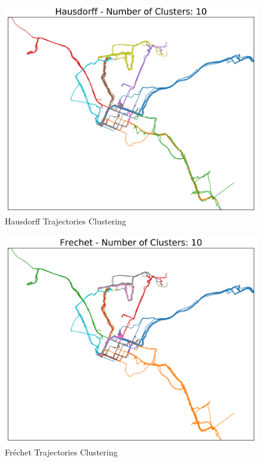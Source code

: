 \documentclass[a4paper, 12pt]{article}
\begin{document}
\begin{figure}[htbp!]
    \centering
    \includegraphics[width=1\textwidth]{hausdorff_trajectory_clustering.png}
    \caption{Hausdorff Trajectories Clustering}
    \label{fig22}
\end{figure}

\begin{figure}[htbp!]
    \centering
    \includegraphics[width=1\textwidth]{frechet_trajectory_clustering.png}
    \caption{Fréchet Trajectories Clustering}
    \label{fig23}
\end{figure}
\end{document}
